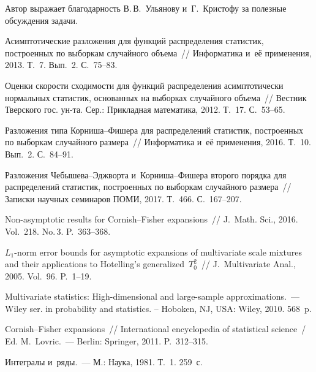 \begin{multicols}{2}
\smallskip 

Автор выражает благодарность В.\,В.~Ульянову и~Г.~Кристофу за полезные обсуждения 
задачи.



{\small\frenchspacing
{%
\begin{thebibliography}{9}

 Асимптотические 
разложения для функций распределения статистик, построенных по выборкам 
случайного объема~// Информатика и~её применения, 2013. Т.~7. Вып.~2. С.~75--83.

 Оценки скорости 
сходимости для функций распределения асимптотически нормальных статистик, 
основанных на выборках случайного объема~// Вестник Тверского гос. 
ун-та. Сер.: Прикладная математика, 2012. Т.~17. С.~53--65.

 Разложения типа Кор\-ни\-ша--Фи\-ше\-ра 
для распределений статистик, построенных по выборкам случайного размера~//  
Информатика и~её применения, 2016. Т.~10. Вып.~2. С.~84--91.

 Разложения Че\-бы\-ше\-ва--Эдж\-вор\-та
 и~Кор\-ни\-ша--Фи\-ше\-ра второго порядка для распределений статистик, 
построенных по выборкам случайного размера~// Записки научных семинаров ПОМИ, 
2017. Т.~466. С.~167--207.

 Non-asymptotic results for 
Cornish--Fisher expansions~// J.~Math. Sci., 2016. Vol.~218. 
No.\,3. P.~363--368.

 $L_1$-norm error bounds for 
asymptotic expansions of multivariate scale mixtures and their applications to 
Hotelling's generalized~$T_0^2$~// J.~Multivariate Anal., 2005. 
Vol.~96. P.~1--19.



 Multivariate statistics: High-dimensional and 
large-sample approximations.~--- Wiley ser. in probability and 
statistics. -- Hoboken, NJ, USA: Wiley, 2010. 568~p.

 Cornish--Fisher expansions~// International encyclopedia 
of statistical science~/ Ed. M.~Lovric.~--- Berlin: Springer, 2011. P.~312--315.

 Интегралы и~ряды.~--- М.: Наука, 1981. 
Т.~1. 259~с.
 \end{thebibliography}

}
}

\end{multicols}

